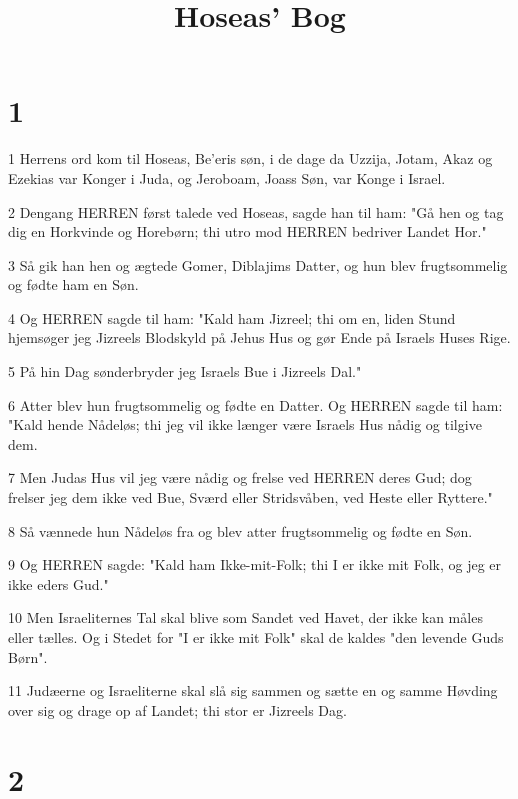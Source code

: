 

\title{Hoseas' Bog}


\chapter{1}

\par 1 Herrens ord kom til Hoseas, Be'eris søn, i de dage da Uzzija, Jotam, Akaz og Ezekias var Konger i Juda, og Jeroboam, Joass Søn, var Konge i Israel.
\par 2 Dengang HERREN først talede ved Hoseas, sagde han til ham: "Gå hen og tag dig en Horkvinde og Horebørn; thi utro mod HERREN bedriver Landet Hor."
\par 3 Så gik han hen og ægtede Gomer, Diblajims Datter, og hun blev frugtsommelig og fødte ham en Søn.
\par 4 Og HERREN sagde til ham: "Kald ham Jizreel; thi om en, liden Stund hjemsøger jeg Jizreels Blodskyld på Jehus Hus og gør Ende på Israels Huses Rige.
\par 5 På hin Dag sønderbryder jeg Israels Bue i Jizreels Dal."
\par 6 Atter blev hun frugtsommelig og fødte en Datter. Og HERREN sagde til ham: "Kald hende Nådeløs; thi jeg vil ikke længer være Israels Hus nådig og tilgive dem.
\par 7 Men Judas Hus vil jeg være nådig og frelse ved HERREN deres Gud; dog frelser jeg dem ikke ved Bue, Sværd eller Stridsvåben, ved Heste eller Ryttere."
\par 8 Så vænnede hun Nådeløs fra og blev atter frugtsommelig og fødte en Søn.
\par 9 Og HERREN sagde: "Kald ham Ikke-mit-Folk; thi I er ikke mit Folk, og jeg er ikke eders Gud."
\par 10 Men Israeliternes Tal skal blive som Sandet ved Havet, der ikke kan måles eller tælles. Og i Stedet for "I er ikke mit Folk" skal de kaldes "den levende Guds Børn".
\par 11 Judæerne og Israeliterne skal slå sig sammen og sætte en og samme Høvding over sig og drage op af Landet; thi stor er Jizreels Dag.

\chapter{2}

